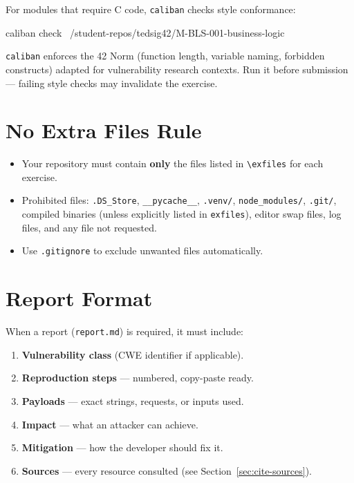 For modules that require C code, \texttt{caliban} checks style
conformance:

\begin{console}
caliban check ~/student-repos/tedsig42/M-BLS-001-business-logic
\end{console}

\texttt{caliban} enforces the 42 Norm (function length, variable
naming, forbidden constructs) adapted for vulnerability research
contexts. Run it before submission --- failing style checks may
invalidate the exercise.

\section{No Extra Files Rule}

\begin{itemize}
  \item Your repository must contain \textbf{only} the files listed in
        \texttt{\textbackslash exfiles} for each exercise.
  \item Prohibited files: \texttt{.DS\_Store}, \texttt{\_\_pycache\_\_},
        \texttt{.venv/}, \texttt{node\_modules/}, \texttt{.git/},
        compiled binaries (unless explicitly listed in \texttt{exfiles}),
        editor swap files, log files, and any file not requested.
  \item Use \texttt{.gitignore} to exclude unwanted files automatically.
\end{itemize}

\section{Report Format}

When a report (\texttt{report.md}) is required, it must include:

\begin{enumerate}
  \item \textbf{Vulnerability class} (CWE identifier if applicable).
  \item \textbf{Reproduction steps} --- numbered, copy-paste ready.
  \item \textbf{Payloads} --- exact strings, requests, or inputs used.
  \item \textbf{Impact} --- what an attacker can achieve.
  \item \textbf{Mitigation} --- how the developer should fix it.
  \item \textbf{Sources} --- every resource consulted (see
        Section~\ref{sec:cite-sources}).
\end{enumerate}

